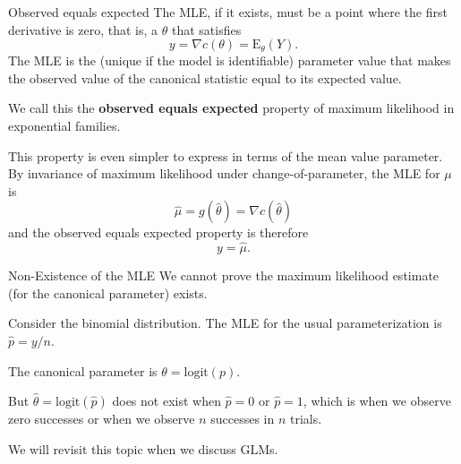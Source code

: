 \documentclass[
  ignorenonframetext,
]{beamer}
\begin{document}
\begin{frame}{Observed equals expected}
\protect\hypertarget{observed-equals-expected}{}
The MLE, if it exists, must be a point where the first derivative is
zero, that is, a \(\theta\) that satisfies \[
  y = \nabla c(\theta) = \text{E}_\theta(Y).
\] The MLE is the (unique if the model is identifiable) parameter value
that makes the observed value of the canonical statistic equal to its
expected value.

We call this the \textbf{observed equals expected} property of maximum
likelihood in exponential families.
\end{frame}

\begin{frame}{}
\protect\hypertarget{section-2}{}
This property is even simpler to express in terms of the mean value
parameter. By invariance of maximum likelihood under
change-of-parameter, the MLE for \(\mu\) is \[
  \hat\mu = g(\hat\theta) = \nabla c(\hat\theta)
\] and the observed equals expected property is therefore
\begin{equation} \label{obsequalsexp}
  y = \hat\mu.  
\end{equation}
\end{frame}

\begin{frame}{Non-Existence of the MLE}
\protect\hypertarget{non-existence-of-the-mle}{}
We cannot prove the maximum likelihood estimate (for the canonical
parameter) exists.

Consider the binomial distribution. The MLE for the usual
parameterization is \(\hat p = y/n\).

The canonical parameter is \(\theta = \text{logit}(p)\).

But \(\hat \theta = \text{logit}(\hat p)\) does not exist when
\(\hat p = 0\) or \(\hat p = 1\), which is when we observe zero
successes or when we observe \(n\) successes in \(n\) trials.

We will revisit this topic when we discuss GLMs.
\end{frame}
\end{document}
